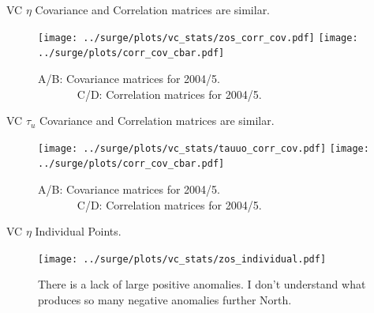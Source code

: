 \begin{frame}{VC $\eta$ Covariance and Correlation matrices are similar. }
\vspace{-20pt}
\begin{figure}[htb!]
  \centering
  \hspace{-10pt}
  \texttt{[image: ../surge/plots/vc\_stats/zos\_corr\_cov.pdf]}
          \texttt{[image: ../surge/plots/corr\_cov\_cbar.pdf]}
  \vspace{-7pt}
  \caption{A/B: Covariance matrices for 2004/5.\\
           $\quad\quad\quad\;\;$C/D: Correlation matrices for 2004/5.}
  \label{fig:}
\end{figure}
\end{frame}


\begin{frame}{VC $\tau_u$ Covariance and Correlation matrices are similar. }
\vspace{-20pt}
\begin{figure}[htb!]
  \centering
  \hspace{-10pt}
  \texttt{[image: ../surge/plots/vc\_stats/tauuo\_corr\_cov.pdf]}
          \texttt{[image: ../surge/plots/corr\_cov\_cbar.pdf]}
  \vspace{-7pt}
  \caption{A/B: Covariance matrices for 2004/5.\\
           $\quad\quad\quad\;\;$C/D: Correlation matrices for 2004/5.}
  \label{fig:}
\end{figure}
\end{frame}

\begin{frame}{VC $\eta$ Individual Points. }
\vspace{-20pt}
\begin{figure}[htb!]
  \centering
  \hspace{-10pt}
  \texttt{[image: ../surge/plots/vc\_stats/zos\_individual.pdf]}
  \vspace{-7pt}
  \caption{There is a lack of large positive anomalies. I don't understand what
  produces so many negative anomalies further North.}
  \label{fig:}
\end{figure}
\end{frame}
